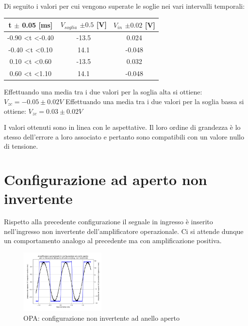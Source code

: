 \documentclass[journal]{IEEEtran}
\begin{document}
Di seguito i valori per cui vengono superate le soglie nei vari intervalli temporali:

\newline

\begin{tabular}{|c|c|c|}
\hline
    t $\pm$ 0.05 {[}ms{]} & $V_{soglia}$ $\pm 0.5$ {[}V{]} & $V_{in}$ $\pm 0.02$ {[}V{]} \\ \hline
-0.90 \textless t \textless -0.40 & -13.5 & 0.024  \\ \hline
-0.40 \textless t \textless 0.10  & 14.1  & -0.048 \\ \hline
0.10 \textless t \textless 0.60   & -13.5 & 0.032  \\ \hline
0.60 \textless t \textless 1.10   & 14.1  & -0.048 \\  \hline
\end{tabular}

Effettuando una media tra i due valori per la soglia alta si ottiene: $V_{zc} = -0.05 \pm 0.02 V$
Effettuando una media tra i due valori per la soglia bassa si ottiene: $V_{zc} = 0.03 \pm 0.02 V$

I valori ottenuti sono in linea con le aspettative. Il loro ordine di grandezza è lo stesso dell'errore a loro associato e pertanto sono compatibili con un valore nullo di
tensione.




\section{\textbf{Configurazione ad aperto non invertente}} %

Rispetto alla precedente configurazione il segnale in ingresso è inserito nell'ingresso non invertente dell'amplificatore operazionale.
Ci si attende dunque un comportamento analogo al precedente ma con amplificazione positiva.

\begin{figure}[H]%
\begin {center}
\includegraphics[width=0.38\textwidth]{analysis/output/OPA-open-loop-non-inv-zero-crossing-z2.pdf}
\caption{OPA: configurazione non invertente ad anello aperto}
\label{fig:oscilloscope}
\end {center}
\end{figure}
\end{document}
